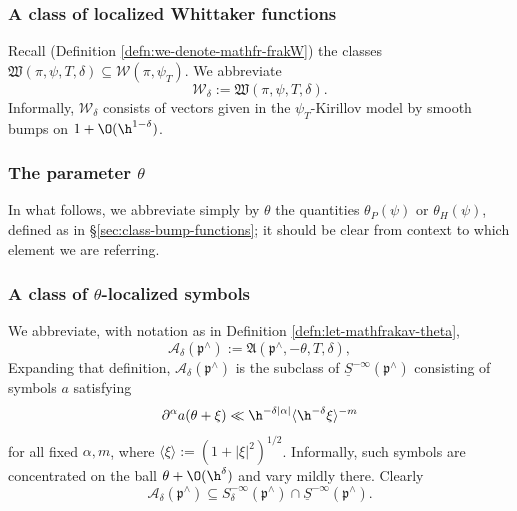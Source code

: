 \subsubsection{A class of localized Whittaker functions}
Recall (Definition \ref{defn:we-denote-mathfr-frakW}) the classes $\mathfrak{W}(\pi,\psi,T,\delta) \subseteq \mathcal{W}(\pi,\psi_T)$.  We abbreviate  
\begin{equation*}
  \mathcal{W}_\delta := \mathfrak{W}(\pi, \psi, T, \delta).
\end{equation*}
Informally, $\mathcal{W}_\delta$ consists of vectors given in the $\psi_T$-Kirillov model by smooth bumps on $1 + \O(\h^{1-\delta})$.

\subsubsection{The parameter $\theta$}
In what follows, we abbreviate simply by $\theta$ the quantities $\theta_P(\psi)$ or $\theta_H(\psi)$, defined as in \S\ref{sec:class-bump-functions}; it should be clear from context to which element we are referring.

\subsubsection{A class of $\theta$-localized symbols}
We abbreviate, with notation as in Definition \ref{defn:let-mathfrakav-theta},   
\begin{equation*}
  \mathcal{A}_\delta(\mathfrak{p}^\wedge) := \mathfrak{A}(\mathfrak{p}^\wedge, -\theta, T, \delta),
\end{equation*}
Expanding that definition, $\mathcal{A}_\delta(\mathfrak{p}^\wedge)$ is the subclass of $\underline{S}^{-\infty}(\mathfrak{p}^\wedge)$ consisting of symbols $a$ satisfying
\begin{equation}\label{eq:partialalpha-axi-ll}
  \partial^\alpha a(\theta + \xi) \ll \h^{-\delta |\alpha|} \langle \h^{-\delta} \xi \rangle^{-m}
\end{equation}
for all fixed $\alpha,m$, where $\langle \xi \rangle := (1 + |\xi|^2)^{1/2}$.  Informally, such symbols are concentrated on the ball $\theta + \O(\h^\delta)$ and vary mildly there.  Clearly
\begin{equation*}
  \mathcal{A}_{\delta}(\mathfrak{p}^\wedge) \subseteq S_{\delta}^{-\infty}(\mathfrak{p}^\wedge) \cap \underline{S}^{-\infty}(\mathfrak{p}^\wedge).
\end{equation*}

